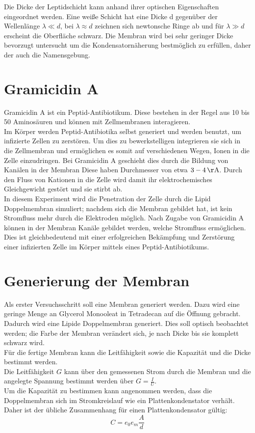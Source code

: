 \documentclass{include/thesisclass3}
\newcommand{\e}[1]{\,\si{#1}}
\begin{document}
Die Dicke der Leptidschicht kann anhand ihrer optischen Eigenschaften eingeordnet werden. Eine weiße Schicht hat eine Dicke d gegenüber der Wellenlänge $\lambda \ll d$, bei $\lambda \approx d$ zeichnen sich newtonsche Ringe ab und für $\lambda \gg d$ erscheint die Oberfläche schwarz. Die Membran wird bei sehr geringer Dicke bevorzugt untersucht um die Kondensatornäherung bestmöglich zu erfüllen, daher der auch die Namensgebung.

\section{Gramicidin A}
Gramicidin A ist ein Peptid-Antibiotikum. Diese bestehen in der Regel aus 10 bis 50 Aminosäuren und können mit Zellmembranen interagieren.\\
Im Körper werden Peptid-Antibiotika selbst generiert und werden benutzt, um infizierte Zellen zu zerstören.  Um dies zu bewerkstelligen integrieren sie sich in die Zellmembran und ermöglichen es somit auf verschiedenen Wegen, Ionen in die Zelle einzudringen. Bei Gramicidin A geschieht dies durch die Bildung von  Kanälen in der Membran Diese haben Durchmesser von etwa $3 - 4\e{\AA}$. Durch den Fluss von Kationen in die Zelle wird damit ihr elektrochemisches Gleichgewicht gestört und sie stirbt ab.\\
In diesem Experiment wird die Penetration der Zelle durch die Lipid Doppelmembran simuliert; nachdem sich die Membran gebildet hat, ist kein Stromfluss mehr durch die Elektroden möglich. Nach Zugabe von Gramicidin A können in der Membran Kanäle gebildet werden, welche Stromfluss ermöglichen. Dies ist gleichbedeutend mit einer erfolgreichen Bekämpfung und Zerstörung einer infizierten Zelle im Körper mittels eines Peptid-Antibiotikums.




\section{Generierung der Membran}
Als erster Versuchsschritt soll eine Membran generiert werden. Dazu wird eine geringe Menge an Glycerol Monooleat in Tetradecan auf die Öffnung gebracht. Dadurch wird eine Lipide Doppelmembran generiert. Dies soll optisch beobachtet werden; die Farbe der Membran verändert sich, je nach Dicke bis sie komplett schwarz wird.\\
Für die fertige Membran kann die Leitfähigkeit sowie die Kapazität und die Dicke bestimmt werden. \\Die Leitfähigkeit $G$ kann über den gemessenen Strom durch die Membran und die angelegte Spannung bestimmt werden über $G = \frac{I}{U}$. \\Um die Kapazität zu bestimmen kann angenommen werden, dass die Doppelmembran  sich im Stromkreislauf wie ein Plattenkondenstator verhält. Daher ist der übliche Zusammenhang für einen Plattenkondensator gültig:
\begin{equation}
C = e_0e_m \frac{A}{d}
\end{equation}
\end{document}

